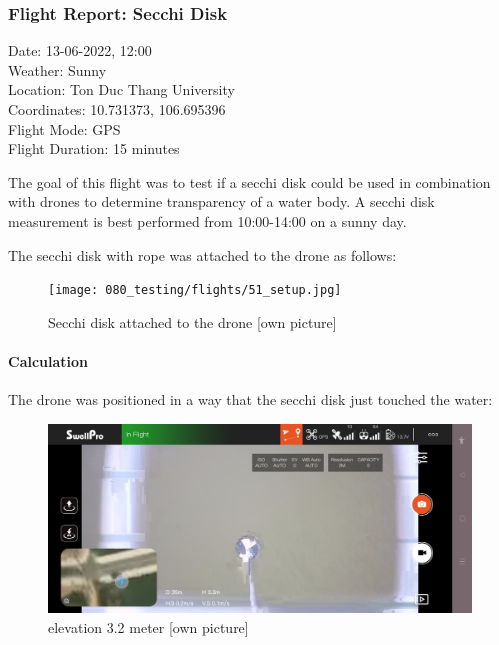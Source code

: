 \newpage
\subsubsection{Flight Report: Secchi Disk}
\begin{minipage}{1\textwidth}
	\begin{flushright}
		Date: 13-06-2022, 12:00\\
		Weather: Sunny\\
		Location: Ton Duc Thang University\\
		Coordinates: 10.731373, 106.695396\\
		Flight Mode: \gls{GPS}\\
		Flight Duration: 15 minutes\\\vspace{5mm}
	\end{flushright}
\end{minipage}

The goal of this flight was to test if a secchi disk could be used in combination with drones to determine transparency of a water body. A secchi disk measurement is best performed from 10:00-14:00 on a sunny day.

The secchi disk with rope was attached to the drone as follows:

\begin{figure}[h]
\centering
\texttt{[image: 080\_testing/flights/51\_setup.jpg]}
\caption{Secchi disk attached to the drone [own picture]}
\end{figure}


\paragraph{Calculation}
The drone was positioned in a way that the secchi disk just touched the water:

\begin{figure}[h]
\centering
\includegraphics[scale=0.3]{080_testing/flights/52_screen1.jpg}
\caption{elevation 3.2 meter [own picture]}
\end{figure}

